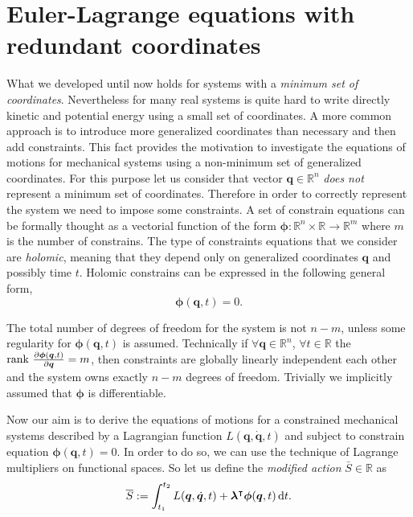 	\section{Euler-Lagrange equations with redundant coordinates}
		What we developed until now holds for systems with a \emph{minimum set of coordinates}.
		Nevertheless for many real systems is quite hard to write directly kinetic and potential
		energy using a small set of coordinates.
		A more common approach is to introduce more generalized coordinates than necessary
		and then add constraints.
		This fact provides the motivation to investigate the equations of motions
		for mechanical systems using a non-minimum set of generalized coordinates.
		For this purpose let us consider that vector $\bm{q}\in\mathbb{R}^{n}$ \emph{does not}
		represent a minimum set of coordinates.
		Therefore in order to correctly represent the system we need to impose
		some constraints. A set of constrain equations can be formally thought as
		a vectorial function of the form
		$\bm{\phi}:\mathbb{R}^{n}\times\mathbb{R}\rightarrow\mathbb{R}^{m}$
		where $m$ is the number of constrains.
		The type of constraints equations that we consider are \emph{holomic},
		meaning that they depend only on generalized coordinates $\bm{q}$ and
		possibly time $t$. Holomic constrains can be expressed in the following general form,
		\begin{equation}\label{eq:constraintsequations}
			\bm{\phi}(\bm{q},t) = 0.
		\end{equation}
		\begin{remark}
			The total number of degrees of freedom for the system is not $n-m$,
			unless some regularity for $\bm{\phi}(\bm{q},t)$ is assumed.
			Technically if $\forall\bm{q}\in\mathbb{R}^{n}$, $\forall t\in\mathbb{R}$
			the $\mathrm{rank}~\frac{\partial\bm{\phi}(\bm{q},t)}{\partial \bm{q}} = m$,
			then constraints are globally linearly independent each other and the
			system owns exactly $n-m$ degrees of freedom.
			Trivially we implicitly assumed that $\bm{\phi}$ is differentiable.
		\end{remark}
		Now our aim is to derive the equations of motions for a constrained
		mechanical systems described by a Lagrangian function $L(\bm{q},\dot{\bm{q}},t)$
		and subject to constrain equation $\bm{\phi}(\bm{q},t)=0$.
		In order to do so, we can use the technique of Lagrange multipliers
		on functional spaces. So let us define the \emph{modified action} $\bar{S}\in\mathbb{R}$ as 
		\begin{equation}
			\label{eq:modifiedaction}
			\overline{S} := \int_{t_{1}}^{t_{2}}
			L(\bm{q},\dot{\bm{q}},t)+\bm{\lambda}^{\intercal}\bm{\phi}(\bm{q},t)\mathop{}\!\mathrm{d} t. 
		\end{equation}
